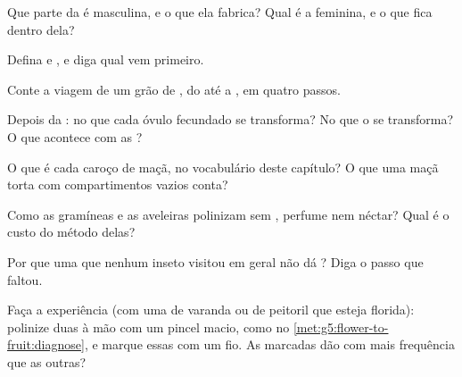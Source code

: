 \begin{exercise}[$\star$]\label{exo:g5:flower-to-fruit:1}
Que parte da  é masculina, e o que ela fabrica? Qual é a
feminina, e o que fica dentro dela?
\end{exercise}

\begin{exercise}[$\star$]\label{exo:g5:flower-to-fruit:2}
Defina  e , e diga qual vem primeiro.
\end{exercise}

\begin{exercise}[$\star$]\label{exo:g5:flower-to-fruit:3}
Conte a viagem de um grão de , do  até a , em quatro passos.
\end{exercise}

\begin{exercise}[$\star$]\label{exo:g5:flower-to-fruit:4}
Depois da : no que cada óvulo fecundado se transforma? No
que o  se transforma? O que acontece com as ?
\end{exercise}

\begin{exercise}[$\star$]\label{exo:g5:flower-to-fruit:5}
O que é cada caroço de maçã, no vocabulário deste capítulo? O que uma
maçã torta com compartimentos vazios conta?
\end{exercise}

\begin{exercise}[$\star$]\label{exo:g5:flower-to-fruit:6}
Como as gramíneas e as aveleiras polinizam sem , perfume nem
néctar? Qual é o custo do método delas?
\end{exercise}

\begin{exercise}[$\star$]\label{exo:g5:flower-to-fruit:7}
Por que uma  que nenhum inseto visitou em geral não dá ?
Diga o passo que faltou.
\end{exercise}

\begin{exercise}[$\star$]\label{exo:g5:flower-to-fruit:8}
Faça a experiência (com uma  de varanda ou de peitoril que
esteja florida): polinize duas  à mão com um pincel macio,
como no \cref{met:g5:flower-to-fruit:diagnose}, e marque essas
 com um fio. As  marcadas dão  com mais frequência
que as outras?
\end{exercise}

